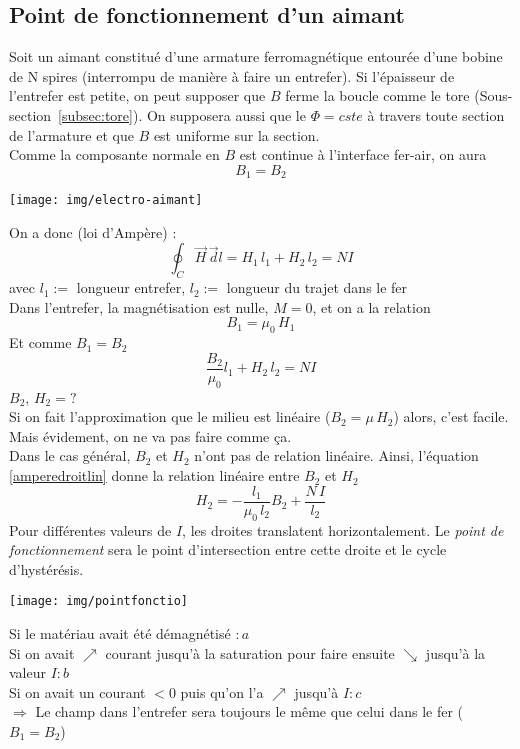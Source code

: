 \documentclass[british,french,11pt, a4paper, openany]{book}
\begin{document}
		\subsection{Point de fonctionnement d'un aimant}
		Soit un aimant constitué d'une armature ferromagnétique entourée d'une bobine de N spires (interrompu de manière à faire un entrefer). Si l'épaisseur de l'entrefer est petite, on peut supposer que $B$ ferme la boucle comme le tore (Sous-section~\ref{subsec:tore}). On supposera aussi que le $\Phi=cste$ à travers toute section de l'armature et que $B$ est uniforme sur la section.\\
		
		Comme la composante normale en $B$ est continue à l'interface fer-air, on aura 
		\begin{equation}
		B_1=B_2
		\end{equation}
		\begin{center}
			\texttt{[image: img/electro-aimant]}
		\end{center}
		On a donc (loi d'Ampère) : \begin{equation}
		\oint_C\vec H\,\vec dl=H_1\,l_1+H_2\,l_2=NI
		\end{equation}
		avec $l_1:=$ longueur entrefer, $l_2:=$ longueur du trajet dans le fer\\
		Dans l'entrefer, la magnétisation est nulle, $M=0$, et on a la relation \begin{equation}
		B_1=\mu_0\,H_1
		\end{equation}\label{amperedroitlin}
		Et comme $B_1=B_2$\begin{equation}
		\frac{B_2}{\mu_0}l_1+H_2\,l_2=NI
		\end{equation}
		$B_2$, $H_2=?$\\
		Si on fait l'approximation que le milieu est linéaire ($B_2=\mu\,H_2$) alors, c'est facile. Mais évidement, on ne va pas faire comme ça.\\
		Dans le cas général, $B_2$ et $H_2$ n'ont pas de relation linéaire. Ainsi, l'équation \eqref{amperedroitlin} donne la relation linéaire entre $B_2$ et $H_2$ \begin{equation}
		H_2=-\frac{l_1}{\mu_0\,l_2}B_2+\frac{N\,I}{l_2}
		\end{equation}
		Pour différentes valeurs de $I$, les droites translatent horizontalement. Le \textit{point de fonctionnement} sera le point d'intersection entre cette droite et le cycle d'hystérésis.
		\begin{center}
			\texttt{[image: img/pointfonctio]}
		\end{center}
		Si le matériau avait été démagnétisé $:a$\\ Si on avait $\nearrow$ courant jusqu'à la saturation pour faire ensuite $\searrow$ jusqu'à la valeur $I:b$ \\Si on avait un courant $<0$ puis qu'on l'a $\nearrow$ jusqu'à $I: c$\\ 
		$\Rightarrow$ Le champ dans l'entrefer sera toujours le même que celui dans le fer ($B_1=B_2$)\\
		
\end{document}
